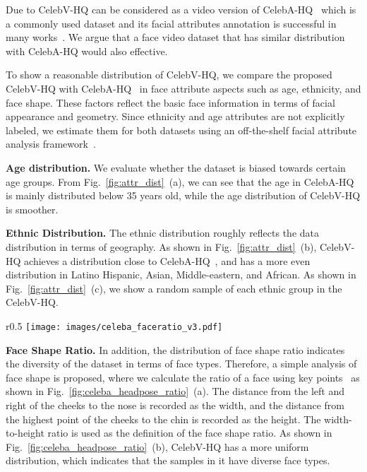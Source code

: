 \documentclass[runningheads]{llncs}
\begin{document}
Due to CelebV-HQ can be considered as a video version of CelebA-HQ~\cite{celebahq} which is a commonly used dataset and its facial attributes annotation is successful in many works~\cite{shen2017learning,e4e,Yao_2021_ICCV,han2017heterogeneous,ding2018deep,stylegan,stylegan2,starganv2}. We argue that a face video dataset that has similar distribution with CelebA-HQ would also effective. 

To show a reasonable distribution of CelebV-HQ, we compare the proposed CelebV-HQ with CelebA-HQ~\cite{celebahq} in face attribute aspects such as age, ethnicity, and face shape. These factors reflect the basic face information in terms of facial appearance and geometry.
Since ethnicity and age attributes are not explicitly labeled, we estimate them for both datasets using an off-the-shelf facial attribute analysis framework~\cite{serengil2021lightface}.



\noindent
\textbf{Age distribution.} We evaluate whether the dataset is biased towards certain age groups. From Fig.~\ref{fig:attr_dist}~(a), we can see that the age in CelebA-HQ is mainly distributed below 35 years old, while the age distribution of CelebV-HQ is smoother.

\noindent
\textbf{Ethnic Distribution.} The ethnic distribution roughly reflects the data distribution in terms of geography. 
As shown in Fig.~\ref{fig:attr_dist}~(b), CelebV-HQ achieves a distribution close to CelebA-HQ~\cite{celebahq}, and has a more even distribution in Latino Hispanic, Asian, Middle-eastern, and African. 
As shown in Fig.~\ref{fig:attr_dist}~(c), we show a random sample of each ethnic group in the CelebV-HQ.

\begin{wrapfigure}{r}{0.5\textwidth}
\vspace{-5mm}
\centering
\texttt{[image: images/celeba\_faceratio\_v3.pdf]}
\caption{\textbf{Distributions of head pose and face shape ratio compared with CelebA-HQ~\cite{celebahq}.} CelebV-HQ contains more diverse head pose and face shape ratio distribution. } 
\label{fig:celeba_headpose_ratio}
\vspace{-5mm}
\end{wrapfigure} 

\noindent \textbf{Face Shape Ratio.} 
In addition, the distribution of face shape ratio indicates the diversity of the dataset in terms of face types. Therefore, a simple analysis of face shape is proposed, where we calculate the ratio of a face using key points~\cite{wu2018look} as shown in Fig.~\ref{fig:celeba_headpose_ratio}~(a).
The distance from the left and right of the cheeks to the nose is recorded as the width, and the distance from the highest point of the cheeks to the chin is recorded as the height. The width-to-height ratio is used as the definition of the face shape ratio.
As shown in Fig.~\ref{fig:celeba_headpose_ratio}~(b), CelebV-HQ has a more uniform distribution, which indicates that the samples in it have diverse face types.
\end{document}
